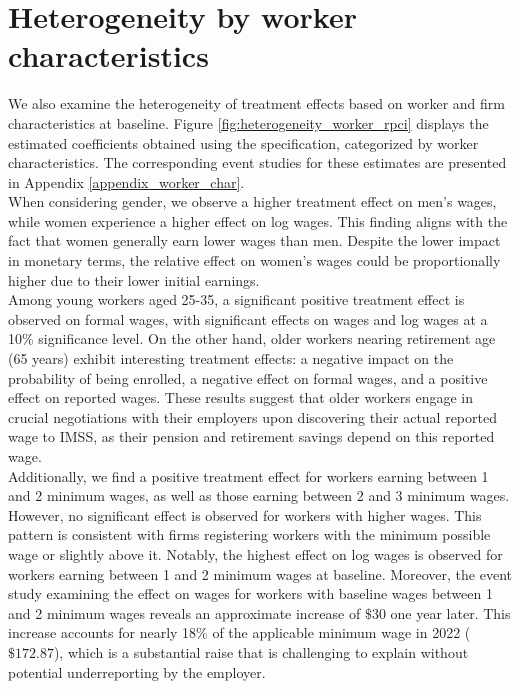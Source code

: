 \documentclass[10pt, oneside]{book}
\begin{document}
\normalsize

\section{Heterogeneity by worker characteristics}

We also examine the heterogeneity of treatment effects based on worker and firm characteristics at baseline. Figure \ref{fig:heterogeneity_worker_rpci} displays the estimated coefficients obtained using the \cite{de2020two} specification, categorized by worker characteristics. The corresponding event studies for these estimates are presented in Appendix \ref{appendix_worker_char}. \\

When considering gender, we observe a higher treatment effect on men's wages, while women experience a higher effect on log wages. This finding aligns with the fact that women generally earn lower wages than men. Despite the lower impact in monetary terms, the relative effect on women's wages could be proportionally higher due to their lower initial earnings. \\

Among young workers aged 25-35, a significant positive treatment effect is observed on formal wages, with significant effects on wages and log wages at a 10\% significance level. On the other hand, older workers nearing retirement age (65 years) exhibit interesting treatment effects: a negative impact on the probability of being enrolled, a negative effect on formal wages, and a positive effect on reported wages. These results suggest that older workers engage in crucial negotiations with their employers upon discovering their actual reported wage to IMSS, as their pension and retirement savings depend on this reported wage. \\

Additionally, we find a positive treatment effect for workers earning between 1 and 2 minimum wages, as well as those earning between 2 and 3 minimum wages. However, no significant effect is observed for workers with higher wages. This pattern is consistent with firms registering workers with the minimum possible wage or slightly above it. Notably, the highest effect on log wages is observed for workers earning between 1 and 2 minimum wages at baseline. Moreover, the event study examining the effect on wages for workers with baseline wages between 1 and 2 minimum wages reveals an approximate increase of $ \$30$ one year later. This increase accounts for nearly 18\% of the applicable minimum wage in 2022 ($\$172.87$), which is a substantial raise that is challenging to explain without potential underreporting by the employer. \\
\end{document}
